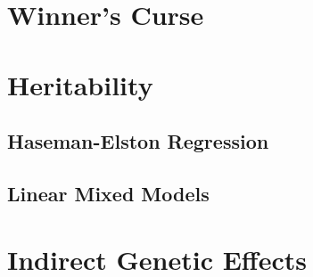 \documentclass{pset}
\begin{document}
\section{Winner's Curse}



\section{Heritability}

\subsection*{Haseman-Elston Regression}


\subsection*{Linear Mixed Models}




\section{Indirect Genetic Effects}
\end{document}
